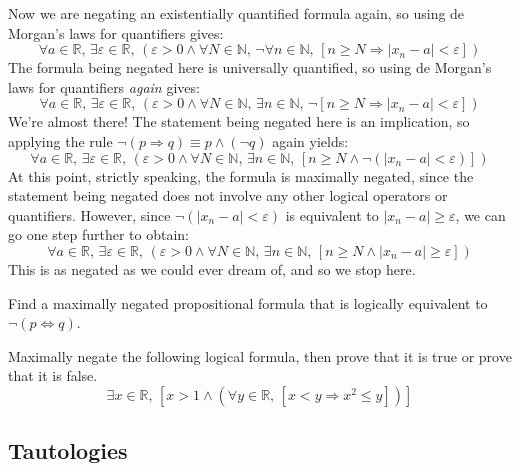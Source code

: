 \begin{example}
%
Now we are negating an existentially quantified formula again, so using de Morgan's laws for quantifiers gives:
\[ \forall a \in \mathbb{R},\, \exists \varepsilon \in \mathbb{R},\, (\varepsilon > 0 \wedge \forall N \in \mathbb{N},\, \neg \forall n \in \mathbb{N},\, [n \ge N \Rightarrow |x_n-a| < \varepsilon])\]
%
The formula being negated here is universally quantified, so using de Morgan's laws for quantifiers \textit{again} gives:
\[ \forall a \in \mathbb{R},\, \exists \varepsilon \in \mathbb{R},\, (\varepsilon > 0 \wedge \forall N \in \mathbb{N},\, \exists n \in \mathbb{N},\, \neg [n \ge N \Rightarrow |x_n-a| < \varepsilon])\]
%
We're almost there! The statement being negated here is an implication, so applying the rule $\neg (p \Rightarrow q) \equiv p \wedge (\neg q)$ again yields:
\[ \forall a \in \mathbb{R},\, \exists \varepsilon \in \mathbb{R},\, (\varepsilon > 0 \wedge \forall N \in \mathbb{N},\, \exists n \in \mathbb{N},\, [n \ge N \wedge \neg (|x_n - a| < \varepsilon)])\]
%
At this point, strictly speaking, the formula is maximally negated, since the statement being negated does not involve any other logical operators or quantifiers. However, since $\neg (|x_n-a| < \varepsilon)$ is equivalent to $|x_n - a| \ge \varepsilon$, we can go one step further to obtain:
\[ \forall a \in \mathbb{R},\, \exists \varepsilon \in \mathbb{R},\, (\varepsilon > 0 \wedge \forall N \in \mathbb{N},\, \exists n \in \mathbb{N},\, [n \ge N \wedge |x_n - a| \ge \varepsilon])\]
%
This is as negated as we could ever dream of, and so we stop here.
\end{example}

\begin{exercise}
Find a maximally negated propositional formula that is logically equivalent to $\neg (p \Leftrightarrow q)$.
\end{exercise}

\begin{exercise}
Maximally negate the following logical formula, then prove that it is true or prove that it is false.
\[ \exists x \in \mathbb{R},\, [x > 1 \wedge (\forall y \in \mathbb{R},\, [x < y \Rightarrow x^2 \le y])]\]
\end{exercise}

\subsection*{Tautologies}

